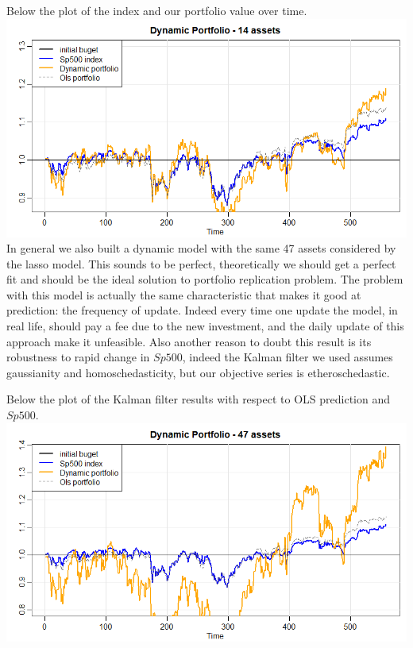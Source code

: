 \documentclass{article}%
\begin{document}
Below the plot of the index and our portfolio value over time.
\\

\includegraphics[scale=0.60]{dynamic14}
\\

In general we also built a dynamic model with the same 47 assets considered by the lasso model. This sounds to be perfect, theoretically we should get a perfect fit and should be the ideal solution to portfolio replication problem. The problem with this model is actually the same characteristic that makes it  good at prediction: the frequency of update. Indeed every time one update the model, in real life, should pay a fee due to the new investment, and the daily update of this approach make it unfeasible. Also another reason to doubt this result is its robustness to rapid change in $Sp500$, indeed the Kalman filter we used assumes gaussianity and homoschedasticity, but our objective series is etheroschedastic.  

Below the plot of the Kalman filter results with respect to OLS prediction and $Sp500$.
\\

\includegraphics[scale=0.60]{dynamic47}
\\
\end{document}
